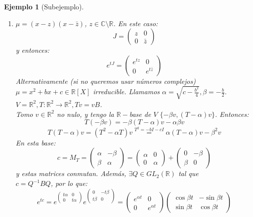 \documentclass[11pt,a4paper]{article}
\theoremstyle{break}
\newtheorem{example}[theorem]{Ejemplo}
\begin{document}
\begin{example}[Subejemplo]
\begin{enumerate}
$\star$ porque las matrices conmutan.
\item [Caso 3.] $\mu = (x - z)(x - \bar{z})$, $z \in \mathbb{C} \setminus \mathbb{R}$. En este caso:
$$J =
\begin{pmatrix}
z & 0 \\
0 & \bar{z}
\end{pmatrix}$$
y entonces:
$$e^{tJ} =
\begin{pmatrix}
e^{tz} & 0 \\
0 & e^{t\bar{z}}
\end{pmatrix}$$
Alternativamente (si no queremos usar números complejos) $\mu = x^{2} + bx + c \in \mathbb{R}[X]$ irreducible. Llamamos $\alpha = \sqrt{c - \frac{b^{2}}{4}}, \beta = -\frac{b}{2}$. \\
$V = \mathbb{R}^{2}, T: \mathbb{R}^{2} \to \mathbb{R}^{2}, Tv = vB$. \\
Tomo $v \in \mathbb{R}^{2}$ no nulo, y tengo la $\mathbb{R}-$base de $V$ $\{-\beta v, (T - \alpha)v\}$. Entonces:
$$T(-\beta v) = -\beta(T - \alpha)v - \alpha \beta v$$
$$T(T - \alpha)v = (T^{2} - \alpha T)v \overset{T^{2} = -bI - cI}{=} \alpha(T - \alpha)v - \beta^{2}v$$
En esta base:
$$c = M_{T} =
\begin{pmatrix}
\alpha & -\beta \\
\beta & \alpha
\end{pmatrix}
=
\begin{pmatrix}
\alpha & 0 \\
0 & \alpha
\end{pmatrix}
+
\begin{pmatrix}
0 & -\beta \\
\beta & 0
\end{pmatrix}$$
y estas matrices conmutan. Además, $\exists Q \in GL_{2}(\mathbb{R})$ tal que \\ $c = Q^{-1}BQ$, por lo que:
$$e^{tc} = e^{
\begin{pmatrix}
t\alpha & 0 \\
0 & t\alpha
\end{pmatrix}
} e^{
\begin{pmatrix}
0 & -t\beta \\
t\beta & 0
\end{pmatrix}
} =
\begin{pmatrix}
e^{\alpha t} & 0 \\
0 & e^{\alpha t}
\end{pmatrix}
\begin{pmatrix}
\cos \beta t & - \sin \beta t \\
\sin \beta t & \cos \beta t
\end{pmatrix}$$
\end{enumerate}
\end{example}
\end{document}
